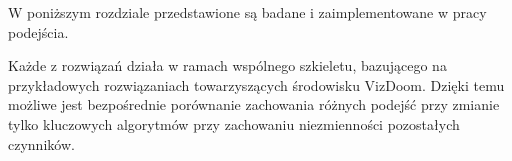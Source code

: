 W poniższym rozdziale przedstawione są badane i zaimplementowane w pracy podejścia.

Każde z rozwiązań działa w ramach wspólnego szkieletu, bazującego na przykładowych rozwiązaniach towarzyszących środowisku VizDoom. Dzięki temu możliwe jest bezpośrednie porównanie zachowania różnych podejść przy zmianie tylko kluczowych algorytmów przy zachowaniu niezmienności pozostałych czynników.
